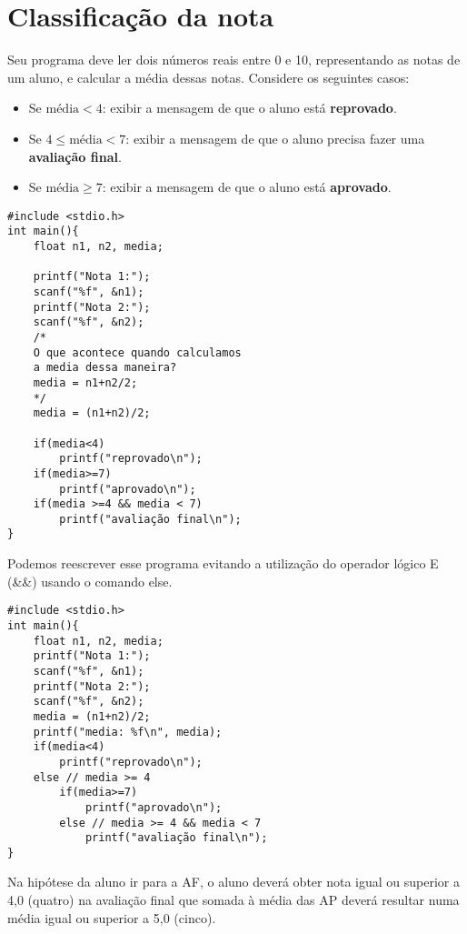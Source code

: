 \documentclass[a4paper,11pt]{article}
\begin{document}
\section*{Classificação da nota}

Seu programa deve ler dois números reais entre 0 e 10, representando as notas de um aluno, e calcular a média dessas notas. Considere os seguintes casos:

\begin{itemize}
    \item Se $\text{média} < 4$: exibir a mensagem de que o aluno está \textbf{reprovado}.
    \item Se $4 \leq \text{média} < 7$: exibir a mensagem de que o aluno precisa fazer uma \textbf{avaliação final}.
    \item Se $\text{média} \geq 7$: exibir a mensagem de que o aluno está \textbf{aprovado}.
\end{itemize}


\begin{verbatim}
#include <stdio.h>
int main(){
	float n1, n2, media;
	
	printf("Nota 1:");
	scanf("%f", &n1);
	printf("Nota 2:");
	scanf("%f", &n2);
	/*
	O que acontece quando calculamos
	a media dessa maneira?
	media = n1+n2/2;
	*/
	media = (n1+n2)/2;
	
	if(media<4) 
		printf("reprovado\n");
	if(media>=7)
		printf("aprovado\n");
	if(media >=4 && media < 7)
		printf("avaliação final\n");
}
\end{verbatim}

Podemos reescrever esse programa evitando a utilização do operador lógico E (\&\&) usando o comando else.


\begin{verbatim}
#include <stdio.h>
int main(){
	float n1, n2, media;
	printf("Nota 1:");
	scanf("%f", &n1);
	printf("Nota 2:");
	scanf("%f", &n2);
	media = (n1+n2)/2;
	printf("media: %f\n", media);
	if(media<4) 
		printf("reprovado\n");
	else // media >= 4
		if(media>=7)
			printf("aprovado\n");
		else // media >= 4 && media < 7
			printf("avaliação final\n");
}
\end{verbatim}

Na hipótese da aluno ir para a AF, o aluno deverá obter nota igual ou superior a 4,0 (quatro) na avaliação final que somada à média das AP deverá resultar numa média igual ou superior a 5,0 (cinco). 
\end{document}
